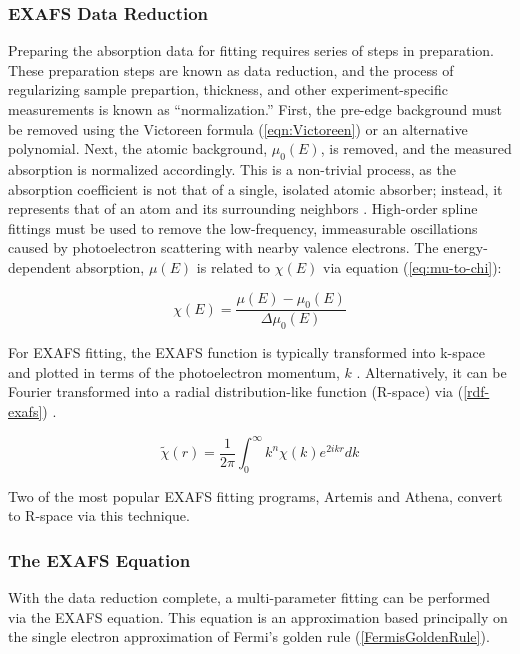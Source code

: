 \subsubsection{EXAFS Data Reduction}
Preparing the absorption data for fitting requires series of steps in preparation. These preparation steps are known as data reduction, and the process of regularizing sample prepartion, thickness, and other experiment-specific measurements is known as ``normalization.'' First, the pre-edge background must be removed using the Victoreen formula (\ref{eqn:Victoreen}) or an alternative polynomial. Next, the atomic background, $ \mu_0(E) $,  is removed, and the measured absorption is normalized accordingly. This is a non-trivial process, as the absorption coefficient is not that of a single, isolated atomic absorber; instead, it represents that of an atom and its surrounding neighbors \cite{feff-exafs-theoretical}. High-order spline fittings must be used to remove the low-frequency, immeasurable oscillations caused by photoelectron scattering with nearby valence electrons. The energy-dependent absorption, $ \mu(E) $ is related to $ \chi(E) $ via equation (\ref{eq:mu-to-chi}): 

\begin{equation}
    \label{eq:mu-to-chi}
    \chi(E) = \dfrac{\mu(E) - \mu_0(E)}{\Delta \mu_0(E)}
\end{equation}

\noindent For EXAFS fitting, the EXAFS function is typically transformed into k-space and plotted in terms of the photoelectron momentum, $ k $ \cite{nicks-thesis}. Alternatively, it can be Fourier transformed into a radial distribution-like function (R-space) via (\ref{rdf-exafs}) \cite{exafsbook}.

\begin{equation}
    \label{rdf-exafs}
    \widetilde{\chi}(r) = \frac{1}{2\pi} \int_{0}^{\infty }  k^n \chi(k) e^{2ikr} dk
\end{equation}

\noindent Two of the most popular EXAFS fitting programs, Artemis and Athena, convert to R-space via this technique.

\subsubsection{The EXAFS Equation}
With the data reduction complete, a multi-parameter fitting can be performed via the {EXAFS} equation. This equation is an approximation based principally on the single electron approximation of Fermi's golden rule (\ref{FermisGoldenRule}).

